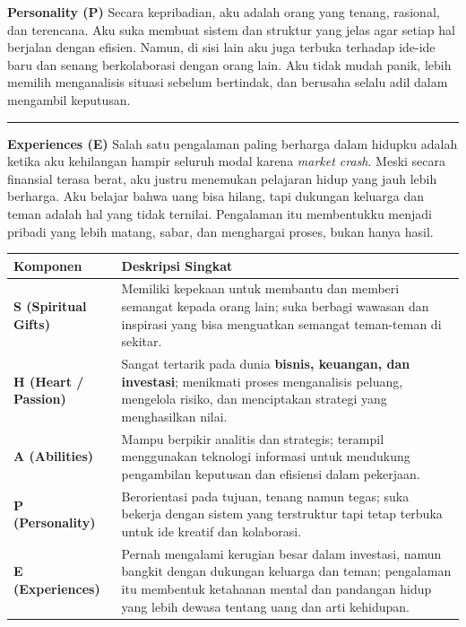 \documentclass[
  letterpaper,
  DIV=11,
  numbers=noendperiod]{scrreprt}
\begin{document}
\textbf{Personality (P)} Secara kepribadian, aku adalah orang yang
tenang, rasional, dan terencana. Aku suka membuat sistem dan struktur
yang jelas agar setiap hal berjalan dengan efisien. Namun, di sisi lain
aku juga terbuka terhadap ide-ide baru dan senang berkolaborasi dengan
orang lain. Aku tidak mudah panik, lebih memilih menganalisis situasi
sebelum bertindak, dan berusaha selalu adil dalam mengambil keputusan.

\begin{center}\rule{0.5\linewidth}{0.5pt}\end{center}

\textbf{Experiences (E)} Salah satu pengalaman paling berharga dalam
hidupku adalah ketika aku kehilangan hampir seluruh modal karena
\emph{market crash}. Meski secara finansial terasa berat, aku justru
menemukan pelajaran hidup yang jauh lebih berharga. Aku belajar bahwa
uang bisa hilang, tapi dukungan keluarga dan teman adalah hal yang tidak
ternilai. Pengalaman itu membentukku menjadi pribadi yang lebih matang,
sabar, dan menghargai proses, bukan hanya hasil.

\begin{longtable}[]{@{}
  >{\raggedright\arraybackslash}p{}
  >{\raggedright\arraybackslash}p{}@{}}
\toprule\noalign{}
\begin{minipage}[b]{\linewidth}\raggedright
Komponen
\end{minipage} & \begin{minipage}[b]{\linewidth}\raggedright
Deskripsi Singkat
\end{minipage} \\
\midrule\noalign{}
\endhead
\bottomrule\noalign{}
\endlastfoot
\textbf{S (Spiritual Gifts)} & Memiliki kepekaan untuk membantu dan
memberi semangat kepada orang lain; suka berbagi wawasan dan inspirasi
yang bisa menguatkan semangat teman-teman di sekitar. \\
\textbf{H (Heart / Passion)} & Sangat tertarik pada dunia
\textbf{bisnis, keuangan, dan investasi}; menikmati proses menganalisis
peluang, mengelola risiko, dan menciptakan strategi yang menghasilkan
nilai. \\
\textbf{A (Abilities)} & Mampu berpikir analitis dan strategis; terampil
menggunakan teknologi informasi untuk mendukung pengambilan keputusan
dan efisiensi dalam pekerjaan. \\
\textbf{P (Personality)} & Berorientasi pada tujuan, tenang namun tegas;
suka bekerja dengan sistem yang terstruktur tapi tetap terbuka untuk ide
kreatif dan kolaborasi. \\
\textbf{E (Experiences)} & Pernah mengalami kerugian besar dalam
investasi, namun bangkit dengan dukungan keluarga dan teman; pengalaman
itu membentuk ketahanan mental dan pandangan hidup yang lebih dewasa
tentang uang dan arti kehidupan. \\
\end{longtable}
\end{document}
